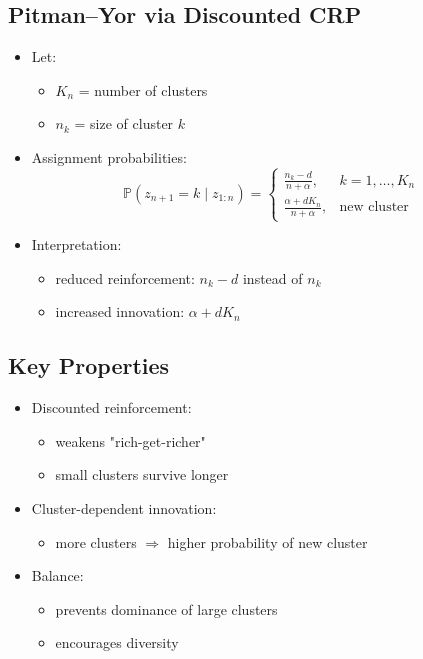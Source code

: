 \documentclass[12pt,oneside]{book}
\numberwithin{equation}{section}
\theoremstyle{definition}
\theoremstyle{plain}
\theoremstyle{remark}
\begin{document}
\subsection*{Pitman--Yor via Discounted CRP}

\begin{itemize}
\item Let:
\begin{itemize}
\item $K_n$ = number of clusters
\item $n_k$ = size of cluster $k$
\end{itemize}

\item Assignment probabilities:
\[
\mathbb{P}(z_{n+1} = k \mid z_{1:n}) =
\begin{cases}
\frac{n_k - d}{n + \alpha}, & k = 1, \dots, K_n \\
\frac{\alpha + d K_n}{n + \alpha}, & \text{new cluster}
\end{cases}
\]

\item Interpretation:
\begin{itemize}
\item reduced reinforcement: $n_k - d$ instead of $n_k$
\item increased innovation: $\alpha + d K_n$
\end{itemize}
\end{itemize}

\subsection*{Key Properties}

\begin{itemize}
\item Discounted reinforcement:
\begin{itemize}
\item weakens "rich-get-richer"
\item small clusters survive longer
\end{itemize}

\item Cluster-dependent innovation:
\begin{itemize}
\item more clusters $\Rightarrow$ higher probability of new cluster
\end{itemize}

\item Balance:
\begin{itemize}
\item prevents dominance of large clusters
\item encourages diversity
\end{itemize}
\end{itemize}
\end{document}
